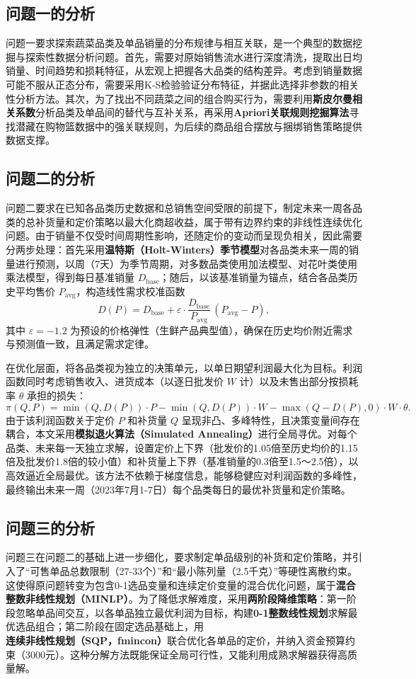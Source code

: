 \documentclass[withoutpreface]{cumcmthesis}
\begin{document}
\subsection{问题一的分析}
问题一要求探索蔬菜品类及单品销量的分布规律与相互关联，是一个典型的数据挖掘与探索性数据分析问题。首先，需要对原始销售流水进行深度清洗，提取出日均销量、时间趋势和损耗特征，从宏观上把握各大品类的结构差异。考虑到销量数据可能不服从正态分布，需要采用K-S检验验证分布特征，并据此选择非参数的相关性分析方法。其次，为了找出不同蔬菜之间的组合购买行为，需要利用\textbf{斯皮尔曼相关系数}分析品类及单品间的替代与互补关系，再采用\textbf{Apriori关联规则挖掘算法}寻找潜藏在购物篮数据中的强关联规则，为后续的商品组合摆放与捆绑销售策略提供数据支撑。

\subsection{问题二的分析}
问题二要求在已知各品类历史数据和总销售空间受限的前提下，制定未来一周各品类的总补货量和定价策略以最大化商超收益，属于带有边界约束的非线性连续优化问题。由于销量不仅受时间周期性影响，还随定价的变动而呈现负相关，因此需要分两步处理：首先采用\textbf{温特斯（Holt-Winters）季节模型}对各品类未来一周的销量进行预测，以周（7天）为季节周期，对多数品类使用加法模型、对花叶类使用乘法模型，得到每日基准销量 $D_{\text{base}}$；随后，以该基准销量为锚点，结合各品类历史平均售价 $P_{\text{avg}}$，构造线性需求校准函数
\[
D(P) = D_{\text{base}} + \varepsilon \cdot \frac{D_{\text{base}}}{P_{\text{avg}}}\, (P_{\text{avg}} - P),
\]
其中 $\varepsilon=-1.2$ 为预设的价格弹性（生鲜产品典型值），确保在历史均价附近需求与预测值一致，且满足需求定律。

在优化层面，将各品类视为独立的决策单元，以单日期望利润最大化为目标。利润函数同时考虑销售收入、进货成本（以逐日批发价 $W$ 计）以及未售出部分按损耗率 $\theta$ 承担的损失：
\[
\pi(Q,P) = \min(Q,D(P))\cdot P - \min(Q,D(P))\cdot W - \max(Q-D(P),0)\cdot W\cdot\theta.
\]
由于该利润函数关于定价 $P$ 和补货量 $Q$ 呈现非凸、多峰特性，且决策变量间存在耦合，本文采用\textbf{模拟退火算法（Simulated Annealing）}进行全局寻优。对每个品类、未来每一天独立求解，设置定价上下界（批发价的1.05倍至历史均价的1.15倍及批发价1.8倍的较小值）和补货量上下界（基准销量的0.3倍至1.5～2.5倍），以高效逼近全局最优。该方法不依赖于梯度信息，能够稳健应对利润函数的多峰性，最终输出未来一周（2023年7月1-7日）每个品类每日的最优补货量和定价策略。

\subsection{问题三的分析}
问题三在问题二的基础上进一步细化，要求制定单品级别的补货和定价策略，并引入了“可售单品总数限制（27-33个）”和“最小陈列量（2.5千克）”等硬性离散约束。这使得原问题转变为包含0-1选品变量和连续定价变量的混合优化问题，属于\textbf{混合整数非线性规划（MINLP）}。为了降低求解难度，采用\textbf{两阶段降维策略}：第一阶段忽略单品间交互，以各单品独立最优利润为目标，构建\textbf{0-1整数线性规划}求解最优选品组合；第二阶段在固定选品基础上，用\textbf{连续非线性规划（SQP，fmincon）}联合优化各单品的定价，并纳入资金预算约束（3000元）。这种分解方法既能保证全局可行性，又能利用成熟求解器获得高质量解。
\end{document}
